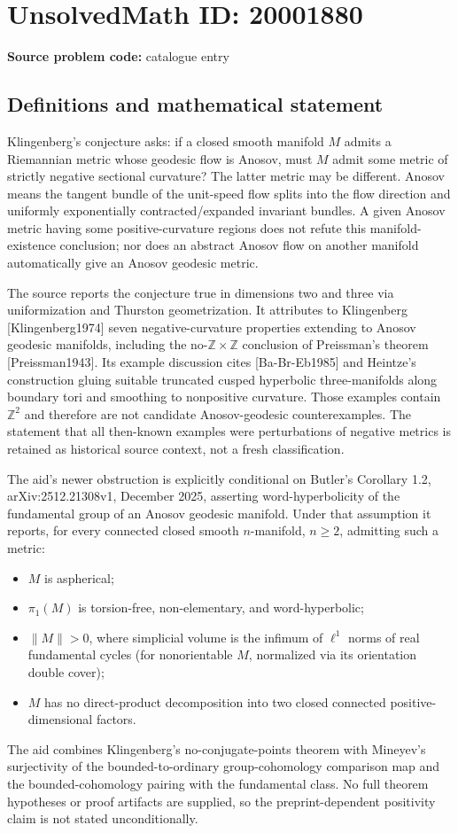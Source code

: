 \documentclass[11pt]{article}
\newcommand{\Z}{\mathbb{Z}}
\begin{document}
\section*{UnsolvedMath ID: 20001880}
\textbf{Source problem code:} catalogue entry
\subsection{Definitions and mathematical statement}
Klingenberg's conjecture asks: if a closed smooth manifold \(M\) admits a Riemannian metric whose geodesic flow is Anosov, must \(M\) admit some metric of strictly negative sectional curvature? The latter metric may be different. Anosov means the tangent bundle of the unit-speed flow splits into the flow direction and uniformly exponentially contracted/expanded invariant bundles. A given Anosov metric having some positive-curvature regions does not refute this manifold-existence conclusion; nor does an abstract Anosov flow on another manifold automatically give an Anosov geodesic metric.

The source reports the conjecture true in dimensions two and three via uniformization and Thurston geometrization. It attributes to Klingenberg [Klingenberg1974] seven negative-curvature properties extending to Anosov geodesic manifolds, including the no-\(\Z\times\Z\) conclusion of Preissman's theorem [Preissman1943]. Its example discussion cites [Ba-Br-Eb1985] and Heintze's construction gluing suitable truncated cusped hyperbolic three-manifolds along boundary tori and smoothing to nonpositive curvature. Those examples contain \(\Z^2\) and therefore are not candidate Anosov-geodesic counterexamples. The statement that all then-known examples were perturbations of negative metrics is retained as historical source context, not a fresh classification.

The aid's newer obstruction is explicitly conditional on Butler's Corollary 1.2, arXiv:2512.21308v1, December 2025, asserting word-hyperbolicity of the fundamental group of an Anosov geodesic manifold. Under that assumption it reports, for every connected closed smooth \(n\)-manifold, \(n\ge2\), admitting such a metric:
\begin{itemize}
\item \(M\) is aspherical;
\item \(\pi_1(M)\) is torsion-free, non-elementary, and word-hyperbolic;
\item \(\|M\|>0\), where simplicial volume is the infimum of \(\ell^1\) norms of real fundamental cycles (for nonorientable \(M\), normalized via its orientation double cover);
\item \(M\) has no direct-product decomposition into two closed connected positive-dimensional factors.
\end{itemize}
The aid combines Klingenberg's no-conjugate-points theorem with Mineyev's surjectivity of the bounded-to-ordinary group-cohomology comparison map and the bounded-cohomology pairing with the fundamental class. No full theorem hypotheses or proof artifacts are supplied, so the preprint-dependent positivity claim is not stated unconditionally.
\end{document}
